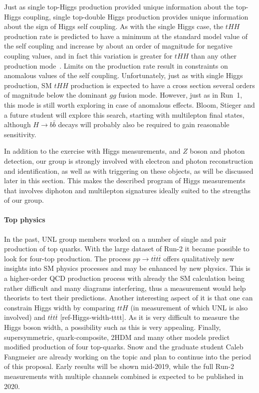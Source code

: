 Just as single top-Higgs production provided unique information about the top-Higgs coupling, single top-double Higgs production provides unique information about the sign of Higgs self coupling.  As with the single Higgs case, the $tHH$ production rate is predicted to have a minimum at the standard model value of the self coupling and increase by about an order of magnitude for negative coupling values, and in fact this variation is greater for $tHH$ than any other production mode~\cite{bib:HHproduction_theory}.  Limits on the production rate result in constraints on anomalous values of the self coupling.  Unfortunately, just as with single Higgs production,  SM $tHH$ production is expected to have a cross section several orders of magnitude below the dominant $gg$ fusion mode.  However, just as in Run~1, this mode is still worth exploring in case of anomalous effects.  Bloom, Stieger and a future student will explore this search, starting with multilepton final states, although $H \to b{\bar b}$ decays will probably also be required to gain reasonable sensitivity.

In addition to the exercise with Higgs measurements, and $Z$ boson and photon detection, our group is strongly involved with electron and photon reconstruction and identification, as well as with triggering on these objects, as will be discussed later in this section. This makes the described program of Higgs measurements that involves diphoton and multilepton signatures ideally suited to the strengths of our group.

\paragraph{Top physics}
%

In the past, UNL group members worked on a number of single and pair production of top quarks. With the large dataset of Run-2 it became possible to look for four-top production. The process $pp\to t\overline{t}t\overline{t}$ offers qualitatively new insights into SM physics processes and may be enhanced by new physics. This is a higher-order QCD production process with already the SM calculation being rather difficult and many diagrams interfering, thus a measurement would help theorists to test their predictions. Another interesting aspect of it is that one can constrain Higgs width by comparing $ttH$ (in measurement of which UNL is also involved) and $t\overline{t}t\overline{t}$ [ref-Higgs-width-tttt]. As it is very difficult to measure the Higgs boson width, a possibility such as this is very appealing. Finally, supersymmetric, quark-composite, 2HDM and many other models predict modified production of four top-quarks. Snow and the graduate student Caleb Fangmeier are already working on the topic and plan to continue into the period of this proposal. Early results will be shown mid-2019, while the full Run-2 measurements with multiple channels combined is expected to be published in 2020.

